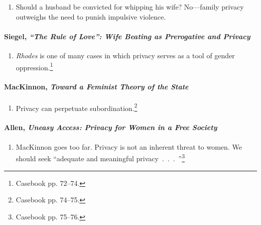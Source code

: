 \begin{enumerate}
    \item Should a husband be convicted for whipping his wife? No---family 
    privacy outweighs the need to punish impulsive violence.
\end{enumerate}

\paragraph{Siegel, \emph{``The Rule of Love'': Wife Beating as Prerogative and 
Privacy}}

\begin{enumerate}
    \item \emph{Rhodes} is one of many cases in which privacy serves as a tool 
    of gender oppression.\footnote{Casebook pp. 72--74.}
\end{enumerate} 

\paragraph{MacKinnon, \emph{Toward a Feminist Theory of the State}}

\begin{enumerate}
    \item Privacy can perpetuate subordination.\footnote{Casebook pp. 74--75.}
\end{enumerate}

\paragraph{Allen, \emph{Uneasy Access: Privacy for Women in a Free Society}}

\begin{enumerate}
    \item MacKinnon goes too far. Privacy is not an inherent threat to 
    women. We should seek ``adequate and meaningful 
    privacy~.~.~.~''\footnote{Casebook pp. 75--76.}
\end{enumerate}
